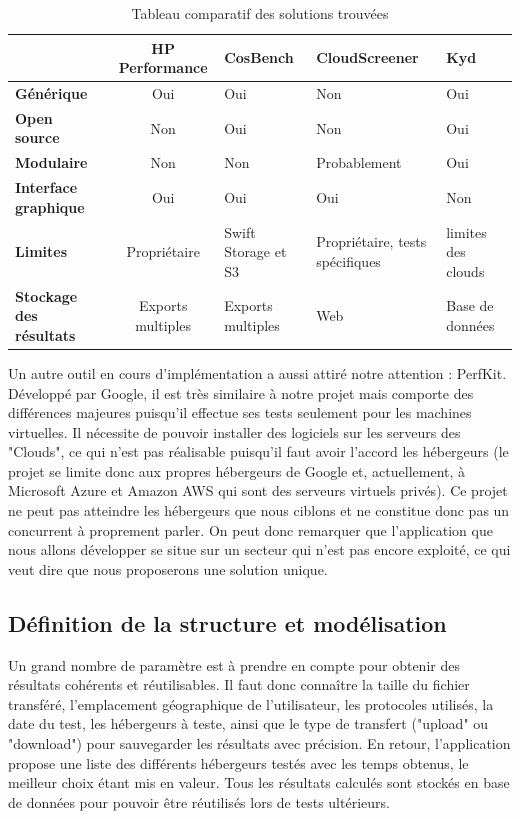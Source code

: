 \documentclass[10pt]{article}
\begin{document}
\begin{table}[h]
\caption{Tableau comparatif des solutions trouvées}
\renewcommand{\arraystretch}{1.5}
\begin{center}
\begin{tabular}{|p{2cm}|c|p{2cm}|p{3cm}|p{2cm}|}
 \hline
     & \bf HP Performance & \bf CosBench & \bf CloudScreener & \bf Kyd  \\
 \hline
 \bf\centering Générique & Oui & Oui & Non & Oui \\
 \hline
  \bf\centering Open source & Non & Oui & Non & Oui \\
 \hline
  \bf\centering Modulaire & Non & Non & Probablement & Oui \\
 \hline
  \bf\centering Interface graphique & Oui & Oui & Oui & Non \\
 \hline
  \bf\centering Limites & Propriétaire & Swift Storage et S3 & Propriétaire, tests spécifiques & limites des clouds \\
 \hline
  \bf\centering Stockage des résultats & Exports multiples & Exports multiples & Web & Base de données \\
 \hline
\end{tabular}
\end{center}
\end{table}

Un autre outil en cours d'implémentation a aussi attiré notre attention : PerfKit. Développé par Google, il est très similaire à notre projet mais comporte des différences majeures puisqu'il effectue ses tests seulement pour les machines virtuelles. Il nécessite de pouvoir installer des logiciels sur les serveurs des "Clouds", ce qui n'est pas réalisable puisqu'il faut avoir l'accord les hébergeurs (le projet se limite donc aux propres hébergeurs de Google et, actuellement, à Microsoft Azure et Amazon AWS qui sont des serveurs virtuels privés). Ce projet ne peut pas atteindre les hébergeurs que nous ciblons et ne constitue donc pas un concurrent à proprement parler. On peut donc remarquer que l’application que nous allons développer se situe sur un secteur qui n’est pas encore exploité, ce qui veut dire que nous proposerons une solution unique.

\subsection{Définition de la structure et modélisation}

Un grand nombre de paramètre est à prendre en compte pour obtenir des résultats cohérents et réutilisables. Il faut donc connaître la taille du fichier transféré, l'emplacement géographique de l'utilisateur, les protocoles utilisés, la date du test, les hébergeurs à teste, ainsi que le type de transfert ("upload" ou "download") pour sauvegarder les résultats avec précision. En retour, l'application propose une liste des différents hébergeurs testés avec les temps obtenus, le meilleur choix étant mis en valeur. Tous les résultats calculés sont stockés en base de données pour pouvoir être réutilisés lors de tests ultérieurs.
\end{document}
